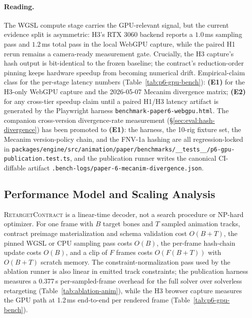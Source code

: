 \documentclass[sigconf,nonacm]{acmart}
\newcommand{\retargetcontract}{\textsc{RetargetContract}}
\begin{document}
\paragraph{Reading.}
The WGSL compute stage carries the GPU-relevant signal, but the current
evidence split is asymmetric: H3's RTX 3060 backend reports a $1.0$\,ms
sampling pass and $1.2$\,ms total pass in the local WebGPU capture, while
the paired H1 rerun remains a camera-ready measurement gate. Crucially,
the H3 capture's hash output is bit-identical to the frozen baseline;
the contract's reduction-order pinning keeps hardware speedup from
becoming numerical drift.
Empirical-claim class for the per-stage latency numbers (Table~\ref{tab:p6-gpu-bench}):
\textbf{(E1)} for the H3-only WebGPU capture and the 2026-05-07 Mecanim
divergence matrix; \textbf{(E2)} for any cross-tier speedup claim until a
paired H1/H3 latency artifact is generated by the Playwright harness
\texttt{benchmark-paper6-webgpu.html}.
The companion cross-version divergence-rate measurement
(\S\ref{sec:eval:hash-divergence}) has been promoted to \textbf{(E1)}:
the harness, the 10-rig fixture set, the Mecanim version-policy chain,
and the FNV-1a hashing are all regression-locked in
\texttt{packages/engine/src/animation/paper/benchmarks/\_\_tests\_\_/p6-gpu-publication.test.ts},
and the publication runner writes the canonical CI-diffable artifact
\texttt{.bench-logs/paper-6-mecanim-divergence.json}.

\subsection{Performance Model and Scaling Analysis}
\label{sec:eval:perfmodel}

\retargetcontract{} is a linear-time decoder, not a search procedure or
NP-hard optimizer. For one frame with $B$ target bones and $T$ sampled
animation tracks, contract preimage materialization and schema validation cost
$O(B + T)$, the pinned WGSL or CPU sampling pass costs $O(B)$, the per-frame
hash-chain update costs $O(B)$, and a clip of $F$ frames costs
$O(F(B + T))$ with $O(B + T)$ scratch memory. The constraint-normalization pass
used by the ablation runner is also linear in emitted track constraints; the
publication harness measures a 0.377\,\textmu{}s per-sampled-frame overhead
for the full solver over solverless retargeting
(Table~\ref{tab:ablation-anim}), while the H3 browser capture measures the
GPU path at 1.2\,ms end-to-end per rendered frame
(Table~\ref{tab:p6-gpu-bench}).
\end{document}
